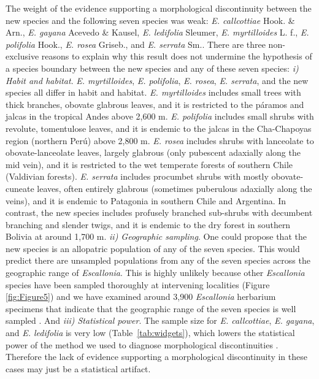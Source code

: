 \documentclass[fleqn,10pt,lineno]{wlpeerj} %
\begin{document}
The weight of the evidence supporting a morphological discontinuity between the new species and the following seven species was weak: \emph{E. callcottiae} Hook. \& Arn., \emph{E. gayana} Acevedo \& Kausel, \emph{E. ledifolia} Sleumer, \emph{E. myrtilloides} L. f., \emph{E. polifolia} Hook., \emph{E. rosea} Griseb., and \emph{E. serrata} Sm.. There are three non-exclusive reasons to explain why this result does not undermine the hypothesis of a species boundary between the new species and any of these seven species: \textit{i) Habit and habitat}. \emph{E. myrtilloides}, \emph{E. polifolia}, \emph{E. rosea}, \emph{E. serrata}, and the new species all differ in habit and habitat. \emph{E. myrtilloides} includes small trees with thick branches, obovate glabrous leaves, and it is restricted to the páramos and jalcas in the tropical Andes above 2,600 m. \emph{E. polifolia} includes small shrubs with revolute, tomentulose leaves, and it is endemic to the jalcas in the Cha-Chapoyas region (northern Perú) above 2,800 m. \emph{E. rosea} includes shrubs with lanceolate to obovate-lanceolate leaves, largely glabrous (only pubescent adaxially along the mid vein), and it is restricted to the wet temperate forests of southern Chile (Valdivian forests). \emph{E. serrata} includes procumbet shrubs with mostly obovate-cuneate leaves, often entirely glabrous (sometimes puberulous adaxially along the veins), and it is endemic to Patagonia in southern Chile and Argentina. In contrast, the new species includes profusely branched sub-shrubs with decumbent branching and slender twigs, and it is endemic to the dry forest in southern Bolivia at around 1,700 m. \textit{ii) Geographic sampling}. One could propose that the new species is an allopatric population of any of the seven species. This would predict there are unsampled populations from any of the seven species across the geographic range of \emph{Escallonia}. This is highly unlikely because other \emph{Escallonia} species have been sampled thoroughly at intervening localities (Figure \ref{fig:Figure5}) and we have examined around 3,900 \emph{Escallonia} herbarium specimens that indicate that the geographic range of the seven species is well sampled \citep{Zapata:2011aa}. And \textit{iii) Statistical power}. The sample size for \emph{E. callcottiae}, \emph{E. gayana}, and \emph{E. ledifolia} is very low (Table~\ref{tab:widgets}), which lowers the statistical power of the method we used to diagnose morphological discontinuities \citep{Zapata:2012it}. Therefore the lack of evidence supporting a morphological discontinuity in these cases may just be a statistical artifact. 
\end{document}
